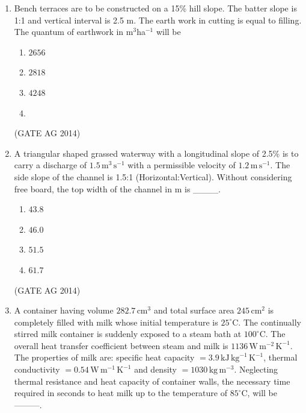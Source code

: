 \documentclass[journal,12pt,onecolumn]{IEEEtran}
\begin{document}
\begin{enumerate}
For a recurrence interval of 20 years, the peak rate of runoff for the 
watershed in m$^3$s$^{-1}$ will be \_\_\_\_.

\begin{multicols}{4}
\begin{enumerate}
\item $2656$  
\item $2818$  
\item $4248$  
\item $5312$  
\end{enumerate}
\end{multicols}
\hfill(GATE AG 2014)

\item Bench terraces are to be constructed on a 15\% hill slope. The batter slope 
is 1:1 and vertical interval is 2.5 m. The earth work in cutting is equal to filling. 
The quantum of earthwork in m$^3$ha$^{-1}$ will be

\begin{multicols}{4}
\begin{enumerate}
\item $2656$  
\item $2818$  
\item $4248$  
\item %
\end{enumerate}
\end{multicols}
\hfill(GATE AG 2014)

\item A triangular shaped grassed waterway with a longitudinal slope of 2.5\% is 
to carry a discharge of $1.5 \, \text{m}^3 \, \text{s}^{-1}$ with a permissible 
velocity of $1.2 \, \text{m} \, \text{s}^{-1}$. 
The side slope of the channel is 1.5:1 (Horizontal:Vertical).  
Without considering free board, the top width of the channel in m is \_\_\_\_.

\begin{multicols}{4}
\begin{enumerate}
\item $43.8$  
\item $46.0$  
\item $51.5$  
\item $61.7$  
\end{enumerate}
\end{multicols}
\hfill(GATE AG 2014)

\item A container having volume $282.7 \, \text{cm}^3$ and total surface area 
$245 \, \text{cm}^2$ is completely filled with milk whose initial temperature 
is $25^\circ \text{C}$. 
The continually stirred milk container is suddenly exposed to a steam bath at 
$100^\circ \text{C}$. The overall heat transfer coefficient between steam and milk is 
$1136 \, \text{W} \, \text{m}^{-2} \, \text{K}^{-1}$.  
The properties of milk are: specific heat capacity $= 3.9 \, \text{kJ} \, \text{kg}^{-1} 
\, \text{K}^{-1}$, thermal conductivity $= 0.54 \, \text{W} \, \text{m}^{-1} \, \text{K}^{-1}$ 
and density $= 1030 \, \text{kg} \, \text{m}^{-3}$.  
Neglecting thermal resistance and heat capacity of container walls, the necessary 
time required in seconds to heat milk up to the temperature of $85^\circ \text{C}$, 
will be ---------.


\end{enumerate}
\end{document}
